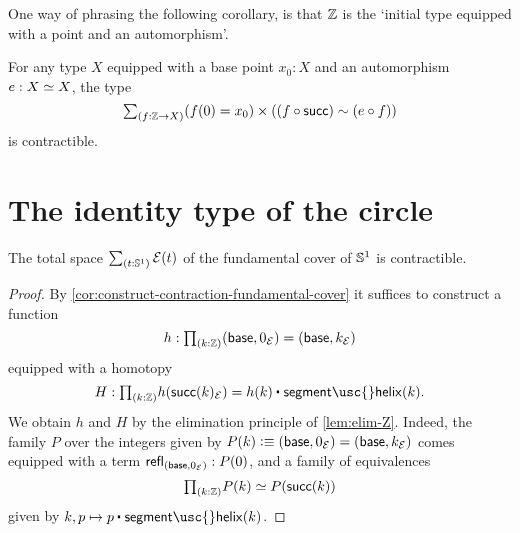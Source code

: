 One way of phrasing the following corollary, is that $\mathbb{Z}$ is the `initial type equipped with a point and an automorphism'.

\begin{cor}
  For any type $X$ equipped with a base point $x_0:X$ and an automorphism $e:\eqv{X}{X}$, the type
  \begin{equation*}
    \sm{f:\Z\to X}(f(0)=x_0)\times ((f \circ \mathsf{succ})\htpy(e\circ f))
  \end{equation*}
  is contractible.
\end{cor}



\section{The identity type of the circle}

\begin{lem}\label{thm:circle_fundamental}
The total space $\sm{t:\sphere{1}}\mathcal{E}(t)$ of the fundamental cover of $\mathbb{S}^{1}$ is contractible.
\end{lem}

\begin{proof}
  By \cref{cor:construct-contraction-fundamental-cover} it suffices to construct
  a function
  \begin{equation*}
    h : \prd{k:\Z}(\base,0_{\mathcal{E}})=(\base,k_{\mathcal{E}})
  \end{equation*}
  equipped with a homotopy
  \begin{equation*}
    H : \prd{k:\Z}h(\mathsf{succ}(k)_{\mathcal{E}})=\ct{h(k)}{\mathsf{segment\usc{}helix}(k)}.
  \end{equation*}
  We obtain $h$ and $H$ by the elimination principle of \cref{lem:elim-Z}. Indeed, the family $P$ over the integers given by $P(k)\vcentcolon\equiv (\mathsf{base},0_{\mathcal{E}})=(\mathsf{base},k_{\mathcal{E}})$ comes equipped with a term $\mathsf{refl}_{(\mathsf{base},0_{\mathcal{E}})}:P(0)$, and a family of equivalences
  \begin{equation*}
    \prd{k:\Z}P(k) \simeq P(\mathsf{succ}(k))
  \end{equation*}
  given by $k,p\mapsto \ct{p}{\mathsf{segment\usc{}helix}(k)}$. 
\end{proof}

